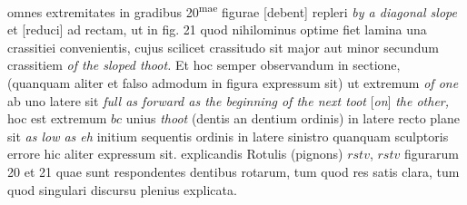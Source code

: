 omnes extremitates in gradibus 20\textsuperscript{mae} figurae [debent] repleri \textit{by a diagonal slope} et [reduci] ad rectam, ut in fig. 21 quod nihilominus optime fiet lamina una crassitiei convenientis, cujus scilicet crassitudo sit major aut minor secundum crassitiem \textit{of the sloped thoot.} Et hoc semper observandum in sectione, (quanquam aliter et falso admodum in figura expressum sit) ut extremum \textit{of one}  ab uno latere sit \textit{full as forward as the beginning of the next toot} [\textit{on}] \textit{the other,} hoc est extremum $bc$ unius \textit{thoot} (dentis an dentium ordinis) in latere recto plane sit \textit{as low as eh} initium sequentis ordinis in latere sinistro quanquam sculptoris errore hic aliter expressum sit.  explicandis Rotulis (pignons) $rstv$, $rstv$ figurarum 20 et 21 quae sunt respondentes dentibus rotarum, tum quod res satis clara, tum quod singulari discursu plenius explicata. 